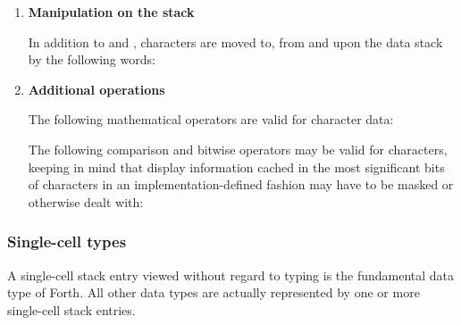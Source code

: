 \begin{enumerate}
\item \textbf{Manipulation on the stack}

	In addition to  and , characters are moved to,
	from and upon the data stack by the following words:
	\begin{quote}\ttfamily
					
					
				
	\end{quote}

\item \textbf{Additional operations}

	The following mathematical operators are valid for character data:
	\begin{quote}\ttfamily
		\word{+}	\word{-}	\word{*}	\word{/}
			
	\end{quote}
	The following comparison and bitwise operators may be valid for
	characters, keeping in mind that display information cached in
	the most significant bits of characters in an implementation-defined
	fashion may have to be masked or otherwise dealt with:
	\begin{quote}\ttfamily
							
				\word{=}	
							
			
	\end{quote}
\end{enumerate}


\subsubsection{Single-cell types} %

A single-cell stack entry viewed without regard to typing is the
fundamental data type of Forth. All other data types are actually
represented by one or more single-cell stack entries.

